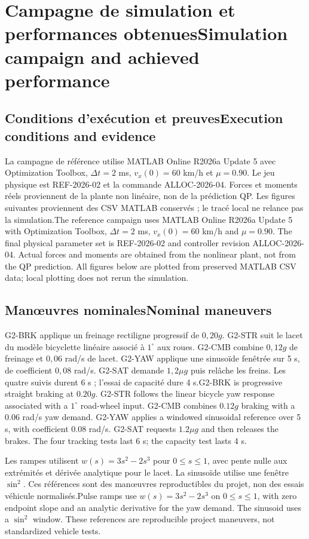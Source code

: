 \documentclass[11pt,a4paper,oneside]{report}
\newcommand{\bi}[2]{\iffrench #2\else #1\fi}
\newcommand{\chap}[2]{\chapter{\bi{#1}{#2}}}
\renewcommand{\sec}[2]{\section{\bi{#1}{#2}}}
\begin{document}
\chap{Simulation campaign and achieved performance}{Campagne de simulation et performances obtenues}\label{chap:results}
\sec{Execution conditions and evidence}{Conditions d'exécution et preuves}
\bi{The reference campaign uses MATLAB Online R2026a Update 5 with Optimization Toolbox, $\Delta t=2$ ms, $v_x(0)=60$ km/h and $\mu=0.90$. The final physical parameter set is REF-2026-02 and controller revision ALLOC-2026-04. Actual forces and moments are obtained from the nonlinear plant, not from the QP prediction. All figures below are plotted from preserved MATLAB CSV data; local plotting does not rerun the simulation.}{La campagne de référence utilise MATLAB Online R2026a Update 5 avec Optimization Toolbox, $\Delta t=2$ ms, $v_x(0)=60$ km/h et $\mu=0.90$. Le jeu physique est REF-2026-02 et la commande ALLOC-2026-04. Forces et moments réels proviennent de la plante non linéaire, non de la prédiction QP. Les figures suivantes proviennent des CSV MATLAB conservés ; le tracé local ne relance pas la simulation.}
\sec{Nominal maneuvers}{Man\oe{}uvres nominales}
\bi{G2-BRK is progressive straight braking at $0.20g$. G2-STR follows the linear bicycle yaw response associated with a $1^\circ$ road-wheel input. G2-CMB combines $0.12g$ braking with a $0.06$ rad/s yaw demand. G2-YAW applies a windowed sinusoidal reference over 5 s, with coefficient $0.08$ rad/s. G2-SAT requests $1.2\mu g$ and then releases the brakes. The four tracking tests last 6 s; the capacity test lasts 4 s.}{G2-BRK applique un freinage rectiligne progressif de $0,20g$. G2-STR suit le lacet du modèle bicyclette linéaire associé à $1^\circ$ aux roues. G2-CMB combine $0,12g$ de freinage et $0,06$ rad/s de lacet. G2-YAW applique une sinusoïde fenêtrée sur 5 s, de coefficient $0,08$ rad/s. G2-SAT demande $1,2\mu g$ puis relâche les freins. Les quatre suivis durent 6 s ; l'essai de capacité dure 4 s.}

\bi{Pulse ramps use $w(s)=3s^2-2s^3$ on $0\leq s\leq1$, with zero endpoint slope and an analytic derivative for the yaw demand. The sinusoid uses a $\sin^2$ window. These references are reproducible project maneuvers, not standardized vehicle tests.}{Les rampes utilisent $w(s)=3s^2-2s^3$ pour $0\leq s\leq1$, avec pente nulle aux extrémités et dérivée analytique pour le lacet. La sinusoïde utilise une fenêtre $\sin^2$. Ces références sont des man\oe{}uvres reproductibles du projet, non des essais véhicule normalisés.}
\end{document}
